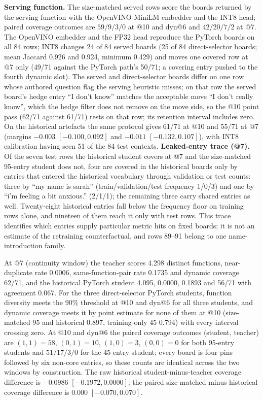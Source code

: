\textbf{Serving function.} The size-matched served rows score the boards returned by the serving function with the OpenVINO MiniLM embedder and the INT8 head; paired coverage outcomes are $59/9/3/0$ at @10 and dyn@6 and $42/20/7/2$ at @7. The OpenVINO embedder and the FP32 head reproduce the PyTorch boards on all 84 rows; INT8 changes 24 of 84 served boards (25 of 84 direct-selector boards; mean Jaccard 0.926 and 0.924, minimum 0.429) and moves one covered row at @7 only (49/71 against the PyTorch path's 50/71; a covering entry pushed to the fourth dynamic slot). The served and direct-selector boards differ on one row whose authored question flag the serving heuristic misses; on that row the served board's hedge entry ``I don't know'' matches the acceptable move ``I don't really know'', which the hedge filter does not remove on the move side, so the @10 point pass (62/71 against 61/71) rests on that row; its retention interval includes zero. On the historical artefacts the same protocol gives 61/71 at @10 and 55/71 at @7 (margins $-0.003$ $[-0.100,0.092]$ and $-0.011$ $[-0.132,0.107]$), with INT8 calibration having seen 51 of the 84 test contexts. %
\textbf{Leaked-entry trace (@7).} Of the seven test rows the historical student covers at @7 and the size-matched 95-entry student does not, four are covered in the historical boards only by entries that entered the historical vocabulary through validation or test counts: three by ``my name is sarah'' (train/validation/test frequency 1/0/3) and one by ``i'm feeling a bit anxious.'' (2/1/1); the remaining three carry shared entries as well. Twenty-eight historical entries fall below the frequency floor on training rows alone, and nineteen of them reach it only with test rows. This trace identifies which entries supply particular metric hits on fixed boards; it is not an estimate of the retraining counterfactual, and rows 89--91 belong to one name-introduction family. %

At @7 (continuity window) the teacher scores 4.298 distinct functions, near-duplicate rate 0.0006, same-function-pair rate 0.1735 and dynamic coverage 62/71, and the historical PyTorch student 4.095, 0.0000, 0.1893 and 56/71 with agreement 0.067. %
For the three direct-selector PyTorch students, function diversity meets the 90\% threshold at @10 and dyn@6 for all three students, and dynamic coverage meets it by point estimate for none of them at @10 (size-matched 95 and historical 0.897, training-only 45 0.794) with every interval crossing zero. At @10 and dyn@6 the paired coverage outcomes (student, teacher) are $(1,1)=58$, $(0,1)=10$, $(1,0)=3$, $(0,0)=0$ for both 95-entry students and $51/17/3/0$ for the 45-entry student; every board is four pins followed by six non-core entries, so these counts are identical across the two windows by construction. The raw historical student-minus-teacher coverage difference is $-0.0986$ $[-0.1972,0.0000]$; the paired size-matched minus historical coverage difference is $0.000$ $[-0.070,0.070]$. %

